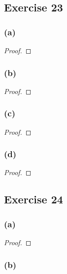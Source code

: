 \documentclass[14pt]{extarticle}
\begin{document}
\subsection{Exercise 23}

\subsubsection{(a)}

\begin{proof}

\end{proof}

\subsubsection{(b)}

\begin{proof}

\end{proof}

\subsubsection{(c)}

\begin{proof}

\end{proof}

\subsubsection{(d)}

\begin{proof}

\end{proof}

\subsection{Exercise 24}

\subsubsection{(a)}

\begin{proof}

\end{proof}

\subsubsection{(b)}
\end{document}
